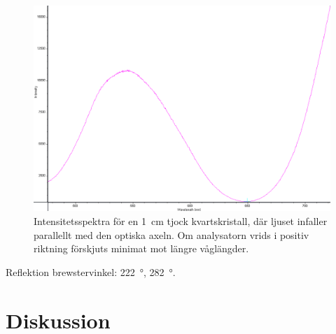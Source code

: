 \documentclass[a4paper]{article}
\begin{document}
\FloatBarrier
\begin{figure}[h!]
	\centering
	\includegraphics[width=\linewidth]{data/spektra_aktiv2_inv}
	\caption{Intensitetsspektra för en \SI{1}{\centi\m} tjock kvartskristall, där ljuset infaller parallellt med den optiska axeln. Om analysatorn vrids i positiv riktning förskjuts minimat mot längre våglängder.}
	\label{fig:}
\end{figure}
\FloatBarrier

Reflektion brewstervinkel: \SI{222}{\degree}, \SI{282}{\degree}.

\section{Diskussion}

 
 {}
 
\end{document}
